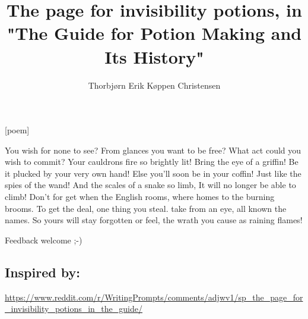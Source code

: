 \documentclass[oneside,english,onecolumn,openbib,a4paper]{memoir}
\title{The page for invisibility potions, in "The Guide for Potion Making and Its History"}
\author{Thorbjørn Erik Køppen Christensen}
\begin{document}
\maketitle{}
[poem]\newline
\begin{centering}
You wish for none to see?\newline
From glances you want to be free?\newline
What act could you wish to commit?\newline
Your cauldrons fire so brightly lit!\newline
\newline
Bring the eye of a griffin!\newline
Be it plucked by your very own hand!\newline
Else you'll soon be in your coffin!\newline
Just like the spies of the wand!\newline
\newline
And the scales of a snake so limb,\newline
It will no longer be able to climb!\newline
Don't for get when the English rooms,\newline
where homes to the burning brooms.\newline
\newline
To get the deal, one thing you steal.\newline
take from an eye, all known the names.\newline
So yours will stay forgotten or feel,\newline
the wrath you cause as raining flames!\newline
\end{centering}
\newline\newline\newline
Feedback welcome ;-)

\subsection{Inspired by:}
\url{https://www.reddit.com/r/WritingPrompts/comments/adjwv1/sp_the_page_for_invisibility_potions_in_the_guide/}
\end{document}
